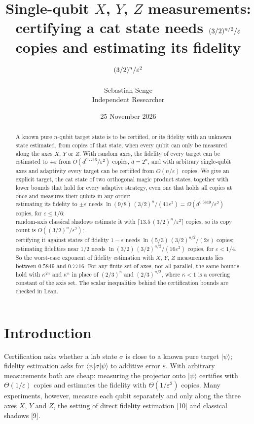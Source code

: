 \documentclass[11pt]{article}
\title{Single-qubit $X$, $Y$, $Z$ measurements: certifying a cat state needs $(3/2)^{n/2}/\eps$ copies and estimating its fidelity $(3/2)^n/\eps^2$}
\author{Sebastian Senge\\Independent Researcher}
\date{25 November 2026}
\theoremstyle{remark}
\newcommand{\eps}{\varepsilon}
\newcommand{\ket}[1]{|#1\rangle}
\newcommand{\bra}[1]{\langle #1|}
\begin{document}
\maketitle

\begin{abstract}
A known pure $n$-qubit target state is to be certified, or its fidelity with an unknown state estimated, from copies of that state, when every qubit can only be measured along the axes $X$, $Y$ or $Z$. With random axes, the fidelity of every target can be estimated to $\pm\eps$ from $O(d^{0.7716}/\eps^2)$ copies, $d = 2^n$, and with arbitrary single-qubit axes and adaptivity every target can be certified from $O(n/\eps)$ copies. We give an explicit target, the cat state of two orthogonal magic product states, together with lower bounds that hold for every adaptive strategy, even one that holds all copies at once and measures their qubits in any order:\\
estimating its fidelity to $\pm\eps$ needs $\ln(9/8)\,(3/2)^n/(41\eps^2) = \Omega(d^{0.5849}/\eps^2)$ copies, for $\eps\le 1/6$;\\
random-axis classical shadows estimate it with $\lceil 13.5\,(3/2)^n/\eps^2\rceil$ copies, so its copy count is $\Theta((3/2)^n/\eps^2)$;\\
certifying it against states of fidelity $1-\eps$ needs $\ln(5/3)\,(3/2)^{n/2}/(2\eps)$ copies;\\
estimating fidelities near $1/2$ needs $\ln(3/2)\,(3/2)^{n/2}/(16\eps^2)$ copies, for $\eps<1/4$.\\
So the worst-case exponent of fidelity estimation with $X$, $Y$, $Z$ measurements lies between $0.5849$ and $0.7716$. For any finite set of axes, not all parallel, the same bounds hold with $\kappa^{2n}$ and $\kappa^n$ in place of $(2/3)^n$ and $(2/3)^{n/2}$, where $\kappa<1$ is a covering constant of the axis set. The scalar inequalities behind the certification bounds are checked in Lean.
\end{abstract}

\section{Introduction}

Certification asks whether a lab state $\sigma$ is close to a known pure target $\ket\psi$; fidelity estimation asks for $\bra\psi\sigma\ket\psi$ to additive error $\eps$. With arbitrary measurements both are cheap: measuring the projector onto $\ket\psi$ certifies with $\Theta(1/\eps)$ copies and estimates the fidelity with $\Theta(1/\eps^2)$ copies. Many experiments, however, measure each qubit separately and only along the three axes $X$, $Y$ and $Z$, the setting of direct fidelity estimation [10] and classical shadows [9].
\end{document}
